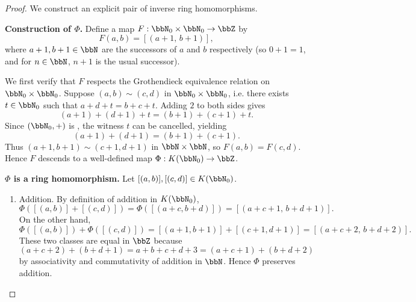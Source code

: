 \begin{proof}
    We construct an explicit pair of inverse ring homomorphisms.

    \textbf{Construction of $\Phi$.} Define a map $F: \bbN_0 \times \bbN_0 \to \bbZ$ by
    $$F(a,b) = [(a+1,\, b+1)],$$
    where $a+1, b+1 \in \bbN$ are the successors of $a$ and $b$ respectively (so $0+1 = 1$, and for $n \in \bbN$, $n+1$ is the usual successor).

    We first verify that $F$ respects the Grothendieck equivalence relation on $\bbN_0 \times \bbN_0$. Suppose $(a,b) \sim (c,d)$ in $\bbN_0 \times \bbN_0$, i.e. there exists $t \in \bbN_0$ such that $a + d + t = b + c + t$. Adding $2$ to both sides gives
    $$(a+1) + (d+1) + t = (b+1) + (c+1) + t.$$
    Since $(\bbN_0,+)$ is , the witness $t$ can be cancelled, yielding
    $$(a+1) + (d+1) = (b+1) + (c+1).$$
    Thus $(a+1,b+1) \sim (c+1,d+1)$ in $\bbN \times \bbN$, so $F(a,b) = F(c,d)$. Hence $F$ descends to a well-defined map $\Phi: K(\bbN_0) \to \bbZ$.

    \textbf{$\Phi$ is a ring homomorphism.} Let $[(a,b)], [(c,d)] \in K(\bbN_0)$.
    \begin{enumerate}
        \item Addition. By definition of addition in $K(\bbN_0)$,
        $$\Phi([(a,b)] + [(c,d)]) = \Phi([(a+c, b+d)]) = [(a+c+1,\, b+d+1)].$$
        On the other hand,
        $$\Phi([(a,b)]) + \Phi([(c,d)]) = [(a+1,b+1)] + [(c+1,d+1)] = [(a+c+2,\, b+d+2)].$$
        These two classes are equal in $\bbZ$ because
        $$(a+c+2) + (b+d+1) = a+b+c+d+3 = (a+c+1) + (b+d+2)$$
        by associativity and commutativity of addition in $\bbN$. Hence $\Phi$ preserves addition.


\end{enumerate}
\end{proof}
